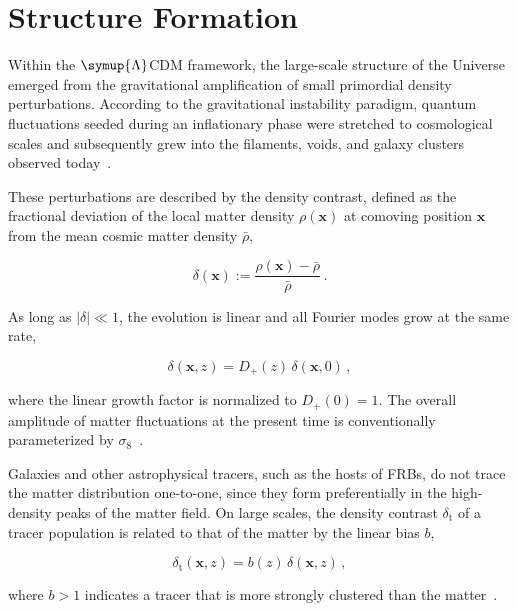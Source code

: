 \section{Structure Formation} \label{sec:structure_formation}
Within the $\symup{\Lambda}$CDM framework, the large-scale structure of the Universe 
emerged from the gravitational amplification of small primordial density perturbations. 
According to the gravitational instability paradigm, quantum fluctuations seeded during 
an inflationary phase were stretched to cosmological scales and subsequently grew into 
the filaments, voids, and galaxy clusters observed today~\cite{Bernardeau_2002, Riotto_2003}.

These perturbations are described by the density contrast, defined as the fractional
deviation of the local matter density $\rho(\mathbf{x})$ at comoving position
$\mathbf{x}$ from the mean cosmic matter density $\bar{\rho}$,

\begin{equation}
    \delta(\mathbf{x})
    := \frac{\rho(\mathbf{x}) - \bar{\rho}}{\bar{\rho}} \,.
\end{equation}

As long as $|\delta| \ll 1$, the evolution is linear and all Fourier modes grow at the
same rate,

\begin{equation}\label{eq:growth_factor}
    \delta(\mathbf{x}, z) = D_+(z)\, \delta(\mathbf{x}, 0) \,,
\end{equation}

where the linear growth factor is normalized to $D_+(0) = 1$. 
The overall amplitude of matter fluctuations at the present time is conventionally 
parameterized by $\sigma_8$~\cite{BartelmannSchneider_2001}.

Galaxies and other astrophysical tracers, such as the hosts of FRBs, do not trace the matter
distribution one-to-one, since they form preferentially in the high-density peaks of the matter
field. On large scales, the density contrast $\delta_{\mathrm{t}}$ of a tracer population is related
to that of the matter by the linear bias $b$,

\begin{equation}\label{eq:linear_bias}
    \delta_{\mathrm{t}}(\mathbf{x}, z) = b(z)\, \delta(\mathbf{x}, z) \,,
\end{equation}

where $b>1$ indicates a tracer that is more strongly clustered than the matter~\cite{Desjacques_2018}.

